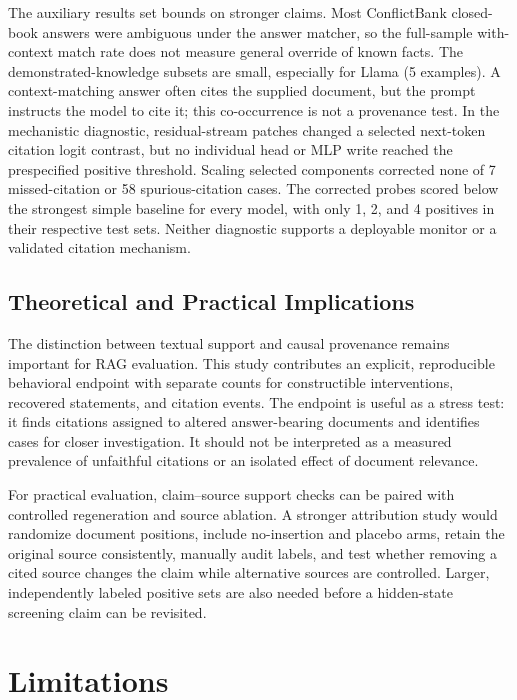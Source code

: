 \documentclass[a4paper,fleqn]{cas-sc}
\begin{document}
The auxiliary results set bounds on stronger claims. Most ConflictBank closed-book answers were ambiguous under the answer matcher, so the full-sample with-context match rate does not measure general override of known facts. The demonstrated-knowledge subsets are small, especially for Llama (5 examples). A context-matching answer often cites the supplied document, but the prompt instructs the model to cite it; this co-occurrence is not a provenance test. In the mechanistic diagnostic, residual-stream patches changed a selected next-token citation logit contrast, but no individual head or MLP write reached the prespecified positive threshold. Scaling selected components corrected none of 7 missed-citation or 58 spurious-citation cases. The corrected probes scored below the strongest simple baseline for every model, with only 1, 2, and 4 positives in their respective test sets. Neither diagnostic supports a deployable monitor or a validated citation mechanism.

\subsection{Theoretical and Practical Implications}
\label{sec:implications}

The distinction between textual support and causal provenance remains important for RAG evaluation. This study contributes an explicit, reproducible behavioral endpoint with separate counts for constructible interventions, recovered statements, and citation events. The endpoint is useful as a stress test: it finds citations assigned to altered answer-bearing documents and identifies cases for closer investigation. It should not be interpreted as a measured prevalence of unfaithful citations or an isolated effect of document relevance.

For practical evaluation, claim--source support checks can be paired with controlled regeneration and source ablation. A stronger attribution study would randomize document positions, include no-insertion and placebo arms, retain the original source consistently, manually audit labels, and test whether removing a cited source changes the claim while alternative sources are controlled. Larger, independently labeled positive sets are also needed before a hidden-state screening claim can be revisited.

\section{Limitations}
\label{sec:limitations}
\end{document}
